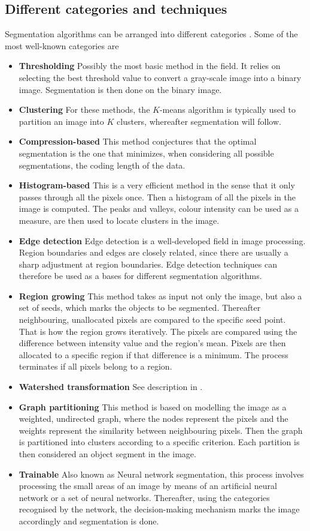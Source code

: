 \documentclass[a4paper,10pt]{article}
\begin{document}
\subsection{Different categories and techniques}
Segmentation algorithms can be arranged into different categories \cite{is}. 
Some of the most well-known categories are
\begin{itemize}
 \item \textbf{Thresholding}  Possibly the most basic method in the
field.  It relies on selecting the best threshold value to convert a gray-scale
image into a binary image.  Segmentation is then done on the binary image. 
 \item \textbf{Clustering} For these methods, the $K$-means algorithm
is typically used to partition an image into $K$ clusters, whereafter
segmentation will follow.
 \item \textbf{Compression-based} This method conjectures that the
optimal segmentation is the one that minimizes, when considering all possible
segmentations, the coding length of the data.
 \item \textbf{Histogram-based}  This is a very efficient method in the
sense that it only passes through all the pixels once.  Then a histogram of all
the pixels in the image is computed.  The peaks and valleys, colour intensity
can be used as a measure, are then used to locate clusters in the image.
 \item \textbf{Edge detection} Edge detection is a well-developed
field in image processing.  Region boundaries and edges are closely related,
since there are usually a sharp adjustment at region boundaries.  Edge detection
techniques can therefore be used as a bases for different segmentation
algorithms.  
 \item \textbf{Region growing} This method takes as input not only
the image, but also a set of seeds, which marks the objects to be segmented. 
Thereafter neighbouring, unallocated pixels are compared to the specific seed
point.  That is how the region grows iteratively.  The pixels are compared using
the difference between intensity value and the region's mean.  Pixels are then
allocated to a specific region if that difference is a minimum.  The process
terminates if all pixels belong to a region.  
 \item \textbf{Watershed transformation} See description in .    
 \item \textbf{Graph partitioning} This method is based on modelling
the image as a weighted, undirected graph, where the nodes represent the pixels
and the weights represent the similarity between neighbouring pixels. Then the
graph is partitioned into clusters according to a specific criterion.  Each
partition is then considered an object segment in the image.       
 \item \textbf{Trainable} Also known as Neural network segmentation,
this process involves processing the small areas of an image by means of an
artificial neural network or a set of neural networks.  Thereafter, using the
categories recognised by the network, the decision-making mechanism marks the
image accordingly and segmentation is done.
\end{itemize}
\end{document}
